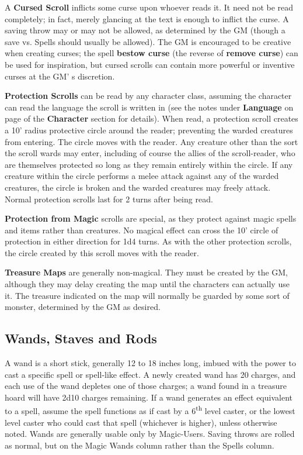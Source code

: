 \documentclass[a4paper,twoside,openany,10pt]{book}
\begin{document}
\begin{multicols}{2}
A \textbf{Cursed Scroll} inflicts some curse upon whoever reads it. It need not be read completely; in fact, merely glancing at the text is enough to inflict the curse. A saving throw may or may not be allowed, as determined by the GM (though a save vs. Spells should usually be allowed). The GM is encouraged to be creative when creating curses; the spell \textbf{bestow curse} (the reverse of \textbf{remove curse}) can be used for inspiration, but cursed scrolls can contain more powerful or inventive curses at the GM' s discretion.

\textbf{Protection Scrolls} can be read by any character class, assuming the character can read the language the scroll is written in (see the notes under \textbf{Language} on page \hyperlink{languages}{\pageref{languages}} of the \textbf{Character} section for details). When read, a protection scroll creates a 10' radius protective circle around the reader; preventing the warded creatures from entering. The circle moves with the reader. Any creature other than the sort the scroll wards may enter, including of course the allies of the scroll-reader, who are themselves protected so long as they remain entirely within the circle. If any creature within the circle performs a melee attack against any of the warded creatures, the circle is broken and the warded creatures may freely attack. Normal protection scrolls last for 2 turns after being read.

\textbf{Protection from Magic} scrolls are special, as they protect against magic spells and items rather than creatures. No magical effect can cross the 10' circle of protection in either direction for 1d4 turns. As with the other protection scrolls, the circle created by this scroll moves with the reader.

\textbf{Treasure Maps} are generally non-magical. They must be created by the GM, although they may delay creating the map until the characters can actually use it. The treasure indicated on the map will normally be guarded by some sort of monster, determined by the GM as desired. 

\subsection{Wands, Staves and Rods}\label{wands-staves-and-rods-1}

A wand is a short stick, generally 12 to 18 inches long, imbued with the power to cast a specific spell or spell-like effect. A newly created wand has 20 charges, and each use of the wand depletes one of those charges; a wand found in a treasure hoard will have 2d10 charges remaining. If a wand generates an effect equivalent to a spell, assume the spell functions as if cast by a 6\textsuperscript{th} level caster, or the lowest level caster who could cast that spell (whichever is higher), unless otherwise noted. Wands are generally usable only by Magic-Users. Saving throws are rolled as normal, but on the Magic Wands column rather than the Spells column.


\end{multicols}
\end{document}

